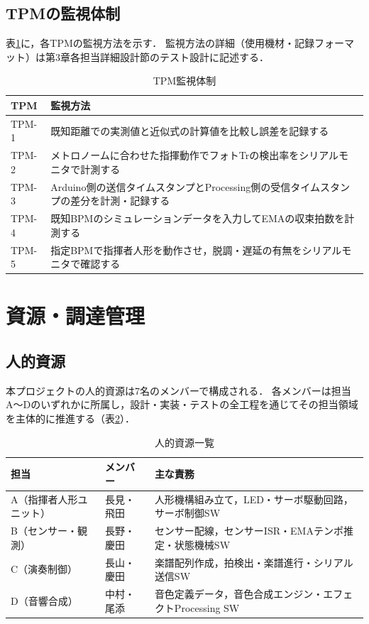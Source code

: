 \documentclass[lualatex,book,paper=a4paper,jafontsize=11.5pt,jafontscale=1.05,oneside]{jlreq}
\begin{document}
\subsection{TPMの監視体制}

表\ref{tab:tpm-monitor}に，各TPMの監視方法を示す．
監視方法の詳細（使用機材・記録フォーマット）は第3章各担当詳細設計節のテスト設計に記述する．

\begin{table}[H]
  \centering
  \caption{TPM監視体制}
  \label{tab:tpm-monitor}
  \begin{tabularx}{\linewidth}{lX}
    \toprule
    TPM & 監視方法 \\
    \midrule
    TPM-1 & 既知距離での実測値と近似式の計算値を比較し誤差を記録する \\
    TPM-2 & メトロノームに合わせた指揮動作でフォトTrの検出率をシリアルモニタで計測する \\
    TPM-3 & Arduino側の送信タイムスタンプとProcessing側の受信タイムスタンプの差分を計測・記録する \\
    TPM-4 & 既知BPMのシミュレーションデータを入力してEMAの収束拍数を計測する \\
    TPM-5 & 指定BPMで指揮者人形を動作させ，脱調・遅延の有無をシリアルモニタで確認する \\
    \bottomrule
  \end{tabularx}
\end{table}

\section{資源・調達管理}

\subsection{人的資源}

本プロジェクトの人的資源は7名のメンバーで構成される．
各メンバーは担当A〜Dのいずれかに所属し，設計・実装・テストの全工程を通じてその担当領域を主体的に推進する（表\ref{tab:human-resource}）．

\begin{table}[H]
  \centering
  \caption{人的資源一覧}
  \label{tab:human-resource}
  \begin{tabularx}{\linewidth}{llX}
    \toprule
    担当 & メンバー & 主な責務 \\
    \midrule
    A（指揮者人形ユニット） & 長見・飛田 & 人形機構組み立て，LED・サーボ駆動回路，サーボ制御SW \\
    B（センサー・観測）     & 長野・慶田 & センサー配線，センサーISR・EMAテンポ推定・状態機械SW \\
    C（演奏制御）           & 長山・慶田 & 楽譜配列作成，拍検出・楽譜進行・シリアル送信SW \\
    D（音響合成）           & 中村・尾添 & 音色定義データ，音色合成エンジン・エフェクトProcessing SW \\
    \bottomrule
  \end{tabularx}
\end{table}
\end{document}
